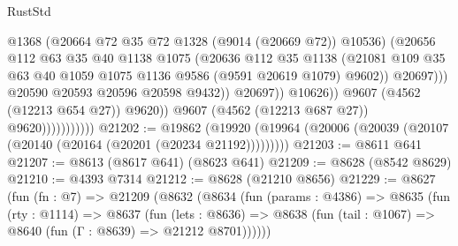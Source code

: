 \begin{lexlean}{RustStd}
\begin{coremodule}
                                              @1368
                                              (@20664 @72 @35 @72 @1328 (@9014 (@20669 @72)) @10536)
                                              (@20656
                                                @112
                                                @63
                                                @35
                                                @40
                                                @1138
                                                @1075
                                                (@20636
                                                  @112
                                                  @35
                                                  @1138
                                                  (@21081
                                                    @109
                                                    @35
                                                    @63
                                                    @40
                                                    @1059
                                                    @1075
                                                    @1136
                                                    @9586
                                                    (@9591 @20619 @1079)
                                                    @9602))
                                                @20697)))
                                          @20590
                                          @20593
                                          @20596
                                          @20598
                                          @9432))
                                      @20697))
                                  @10626))
                              @9607
                              (@4562 (@12213 @654 @27))
                              @9620))
                          @9607
                          (@4562 (@12213 @687 @27))
                          @9620)))))))))))
@21202 := @19862
    (@19920 (@19964 (@20006 (@20039 (@20107 (@20140 (@20164 (@20201 (@20234 @21192)))))))))
@21203 := @8611 @641
@21207 := @8613 (@8617 @641) (@8623 @641)
@21209 := @8628 (@8542 @8629)
@21210 := @4393 @7314
@21212 := @8628 (@21210 @8656)
@21229 := @8627
    (fun (fn : @7) =>
    @21209
      (@8632
        (@8634
          (fun (params : @4386) =>
          @8635
            (fun (rty : @1114) =>
            @8637
              (fun (lets : @8636) =>
              @8638 (fun (tail : @1067) => @8640 (fun (Γ : @8639) => @21212 @8701))))))

\end{coremodule}
\end{lexlean}
